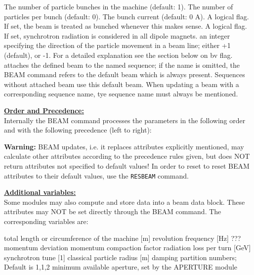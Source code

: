 \begin{madlist}
   The number of particle bunches in the
  machine (default: 1).  
   \label{beam_npart} The number of particles per bunch (default: 0). 
   The bunch current (default: 0 A). 
   A logical flag. If set, the beam is
  treated as bunched whenever this makes sense.  
   \label{beam_radiate} A logical flag. If set, synchrotron
  radiation is considered in all dipole magnets.  
   an integer specifying the direction of the
  particle movement in a beam line; either +1 (default), or -1. For a
  detailed explanation see the section below on bv flag.  
   attaches the defined beam to the named sequence; if
  the name is omitted, the BEAM command refers to the default beam
  which is always present. Sequences without attached beam use this
  default beam. When updating a beam with a corresponding sequence name,
  tye sequence name must always be mentioned.    
\end{madlist} 

\textbf{\underline{Order and Precedence:}}\\
Internally the BEAM command processes the parameters in the following
order and with the following precedence (left to right): 

\textbf{Warning:} BEAM updates, i.e. it replaces attributes explicitly
mentioned, may calculate other attributes according to the precedence rules
given, but does NOT return attributes not specified to default values! 
In order to reset to reset BEAM attributes to their default values, use
the \texttt{RESBEAM} command.


\textbf{\underline{Additional variables:}}\\ 
Some \mad modules may also compute and store data into a beam data 
block. These attributes may NOT be set directly through the BEAM
command. The corresponding variables are:  
\begin{madlist}
   total length or circumference of the machine [m]
   revolution frequency [Hz]
   ???
   momentum deviation
   momentum compaction factor
   radiation loss per turn [GeV]
   synchrotron tune [1]
   classical particle radius [m]
   damping partition numbers; Default is {1,1,2}
   minimum available aperture, set by the APERTURE module
\end{madlist}

